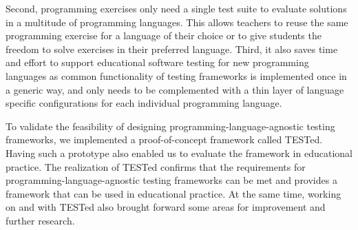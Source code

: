 \documentclass[../main]{subfiles}
\begin{document}
Second, programming exercises only need a single test suite to evaluate solutions in a multitude of programming languages.
This allows teachers to reuse the same programming exercise for a language of their choice or to give students the freedom to solve exercises in their preferred language.
Third, it also saves time and effort to support educational software testing for new programming languages as common functionality of testing frameworks is implemented once in a generic way, and only needs to be complemented with a thin layer of language specific configurations for each individual programming language.

To validate the feasibility of designing programming-language-agnostic testing frameworks, we implemented a proof-of-concept framework called TESTed.
Having such a prototype also enabled us to evaluate the framework in educational practice.
The realization of TESTed confirms that the requirements for programming-language-agnostic testing frameworks can be met and provides a framework that can be used in educational practice.
At the same time, working on and with TESTed also brought forward some areas for improvement and further research.
\end{document}
